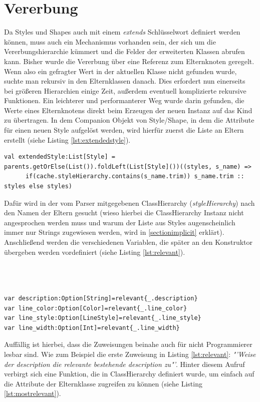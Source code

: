 \section{Vererbung}\label{sectionInheritance}
Da Styles und Shapes auch mit einem \textit{extends} Schlüsselwort definiert werden können, muss auch ein Mechanismus vorhanden sein, der sich um die Vererbungshierarchie kümmert und die Felder der erweiterten Klassen abrufen kann.
Bisher wurde die Vererbung über eine Referenz zum Elternknoten geregelt. Wenn also ein gefragter Wert in der aktuellen Klasse nicht gefunden wurde, suchte man rekursiv in den Elternklassen danach.
Dies erfordert nun einerseits bei größeren Hierarchien einige Zeit, außerdem eventuell komplizierte rekursive Funktionen.
Ein leichterer und performanterer Weg wurde darin gefunden, die Werte eines Elternknotens direkt beim Erzeugen der neuen Instanz auf das Kind zu übertragen.
In dem Companion Objekt von Style/Shape, in dem die Attribute für einen neuen Style aufgelöst werden, wird hierfür zuerst die Liste an Eltern erstellt (siehe Listing \ref{lst:extendedstyle}).
\begin{lstlisting}[style=scala, caption = {Auszug aus Code sammeln der Elterninstanzen}, label = {lst:extendedstyle}]
val extendedStyle:List[Style] = parents.getOrElse(List()).foldLeft(List[Style]())((styles, s_name) =>
      if(cache.styleHierarchy.contains(s_name.trim)) s_name.trim :: styles else styles)
\end{lstlisting}Dafür wird in der vom Parser mitgegebenen ClassHierarchy (\textit{styleHierarchy}) nach den Namen der Eltern gesucht (wieso hierbei die ClassHierarchy Instanz nicht angesprochen werden muss und warum der Liste aus Styles augenscheinlich immer nur Strings zugewiesen werden, wird in \ref{sectionimplicit} erklärt).
Anschließend werden die verschiedenen Variablen, die später an den Konstruktor übergeben werden vordefiniert (siehe Listing \ref{lst:relevant}).\\\\\\\\
\begin{lstlisting}[style=scala, caption = {Auszug aus Code Zuweisung der Felder der Elternelemente}, label = {lst:relevant}]
var description:Option[String]=relevant{_.description}
var line_color:Option[Color]=relevant{_.line_color}
var line_style:Option[LineStyle]=relevant{_.line_style}
var line_width:Option[Int]=relevant{_.line_width}
\end{lstlisting}Auffällig ist hierbei, dass die Zuweisungen beinahe auch für nicht Programmierer lesbar sind. Wie zum Beispiel die erste Zuweisung in Listing \ref{lst:relevant}: \textit{"'Weise der description die relevante bestehende description zu"'}. Hinter diesem Aufruf verbirgt sich eine Funktion, die in ClassHierarchy definiert wurde, um einfach auf die Attribute der Elternklasse zugreifen zu können (siehe Listing \ref{lst:mostrelevant}).
